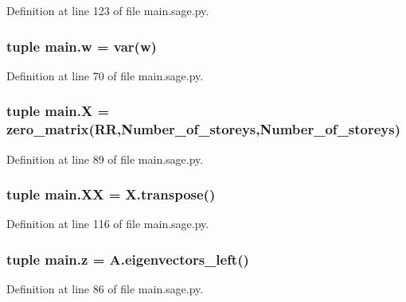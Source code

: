 Definition at line 123 of file main.\+sage.\+py.

\hypertarget{namespacemain_af76005101c339a32cd5d37ba82ee072c}{}
\subsubsection[{w}]{\setlength{\rightskip}{0pt plus 5cm}tuple main.\+w = var(\textquotesingle{}w\textquotesingle{})}\label{namespacemain_af76005101c339a32cd5d37ba82ee072c}


Definition at line 70 of file main.\+sage.\+py.

\hypertarget{namespacemain_a5eac8e4368036ef94463d6e42c1628c5}{}
\subsubsection[{X}]{\setlength{\rightskip}{0pt plus 5cm}tuple main.\+X = zero\+\_\+matrix(R\+R,Number\+\_\+of\+\_\+storeys,Number\+\_\+of\+\_\+storeys)}\label{namespacemain_a5eac8e4368036ef94463d6e42c1628c5}


Definition at line 89 of file main.\+sage.\+py.

\hypertarget{namespacemain_ae18df6a00aee4516c7ad8961b666e2a3}{}
\subsubsection[{X\+X}]{\setlength{\rightskip}{0pt plus 5cm}tuple main.\+X\+X = X.\+transpose()}\label{namespacemain_ae18df6a00aee4516c7ad8961b666e2a3}


Definition at line 116 of file main.\+sage.\+py.

\hypertarget{namespacemain_a2d5b336e3b2f7d2e14f04fa3cc413457}{}
\subsubsection[{z}]{\setlength{\rightskip}{0pt plus 5cm}tuple main.\+z = A.\+eigenvectors\+\_\+left()}\label{namespacemain_a2d5b336e3b2f7d2e14f04fa3cc413457}


Definition at line 86 of file main.\+sage.\+py.

